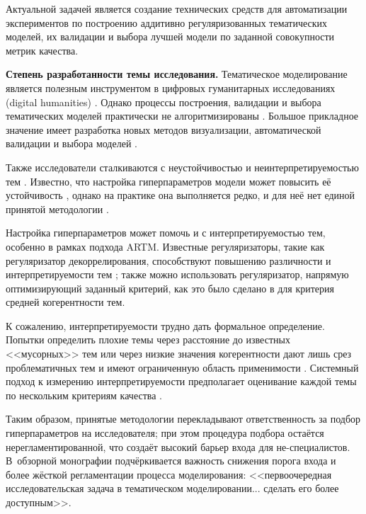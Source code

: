 Актуальной задачей является создание технических средств для автоматизации экспериментов по построению аддитивно регуляризованных тематических моделей, их валидации и выбора лучшей модели по заданной совокупности метрик качества. 

\textbf{Степень разработанности темы исследования.}
Тематическое моделирование является полезным инструментом в цифровых гуманитарных исследованиях (digital humanities) \cite{grimmer2013text,paakkonen2020humanistic}. Однако процессы построения, валидации и выбора тематических моделей практически не алгоритмизированы \cite{paakkonen2020humanistic}. Большое прикладное значение имеет разработка новых методов визуализации, автоматической валидации и выбора моделей \cite{dh_sea}.

Также исследователи сталкиваются с неустойчивостью \cite{mantyla2018measuring} и неинтерпретируемостью тем \cite{boydcare}. Известно, что настройка гиперпараметров модели может повысить её устойчивость \cite{agrawal2018wrong}, однако на практике она выполняется редко, и для неё нет единой принятой методологии  \cite{agrawal2018wrong,chen2016survey}.

Настройка гиперпараметров может помочь и с интерпретируемостью тем, особенно в рамках подхода ARTM. Известные регуляризаторы, такие как регуляризатор декоррелирования, способствуют повышению различности и интерпретируемости тем \cite{popov_hier}; также можно использовать  регуляризатор, напрямую оптимизирующий заданный критерий, как это было сделано в \cite{4keys} для критерия средней когерентности тем.

К сожалению, интерпретируемости трудно дать формальное определение. Попытки определить плохие темы через расстояние до известных <<мусорных>> тем или через низкие значения когерентности дают лишь срез проблематичных тем и имеют ограниченную область применимости \cite{boydcare}. Системный подход к измерению интерпретируемости предполагает оценивание каждой темы по нескольким критериям качества \cite{fan2019assessing}.

Таким образом, принятые методологии перекладывают ответственность за подбор гиперпараметров на исследователя; при этом процедура подбора остаётся нерегламентированной, что создаёт высокий барьер входа для не-специалистов. 
В~обзорной монографии \cite{fntir2017applications} подчёркивается важность снижения порога входа и более жёсткой регламентации процесса моделирования: <<первоочередная исследовательская задача в тематическом моделировании... сделать его более доступным>>.

